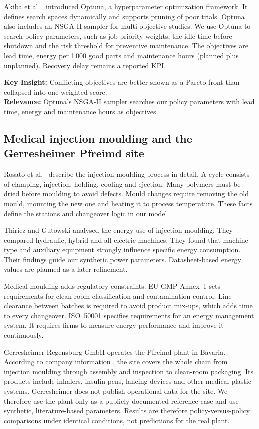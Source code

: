 \documentclass[11pt,a4paper]{article}
\begin{document}
Akiba et al.\ \cite{akiba2019} introduced Optuna, a hyperparameter optimization framework. It defines search spaces dynamically and supports pruning of poor trials. Optuna also includes an NSGA-II sampler for multi-objective studies. We use Optuna to search policy parameters, such as job priority weights, the idle time before shutdown and the risk threshold for preventive maintenance. The objectives are lead time, energy per 1\,000 good parts and maintenance hours (planned plus unplanned). Recovery delay remains a reported KPI.

\textbf{Key Insight:} Conflicting objectives are better shown as a Pareto front than collapsed into one weighted score.\\
\textbf{Relevance:} Optuna's NSGA-II sampler searches our policy parameters with lead time, energy and maintenance hours as objectives.

\subsection{Medical injection moulding and the Gerresheimer Pfreimd site}
Rosato et al.\ \cite{rosato2000} describe the injection-moulding process in detail. A cycle consists of clamping, injection, holding, cooling and ejection. Many polymers must be dried before moulding to avoid defects. Mould changes require removing the old mould, mounting the new one and heating it to process temperature. These facts define the stations and changeover logic in our model.

Thiriez and Gutowski \cite{thiriez2006} analysed the energy use of injection moulding. They compared hydraulic, hybrid and all-electric machines. They found that machine type and auxiliary equipment strongly influence specific energy consumption. Their findings guide our synthetic power parameters. Datasheet-based energy values are planned as a later refinement.

Medical moulding adds regulatory constraints. EU GMP Annex~1 \cite{eugmp2022} sets requirements for clean-room classification and contamination control. Line clearance between batches is required to avoid product mix-ups, which adds time to every changeover. ISO~50001 \cite{iso50001} specifies requirements for an energy management system. It requires firms to measure energy performance and improve it continuously.

Gerresheimer Regensburg GmbH operates the Pfreimd plant in Bavaria. According to company information \cite{gx_pfreimd}, the site covers the whole chain from injection moulding through assembly and inspection to clean-room packaging. Its products include inhalers, insulin pens, lancing devices and other medical plastic systems. Gerresheimer does not publish operational data for the site. We therefore use the plant only as a publicly documented reference case and use synthetic, literature-based parameters. Results are therefore policy-versus-policy comparisons under identical conditions, not predictions for the real plant.
\end{document}
